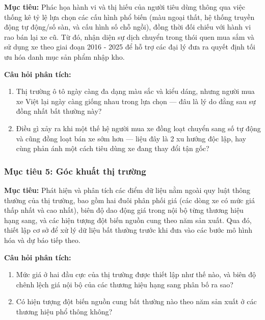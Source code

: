 \noindent\textbf{Mục tiêu:} Phác họa hành vi và thị hiếu của người tiêu dùng thông qua việc thống kê tỷ lệ lựa chọn các cấu hình phổ biến (màu ngoại thất, hệ thống truyền động tự động/số sàn, và cấu hình số chỗ ngồi), đồng thời đối chiếu với hành vi rao bán lại xe cũ. Từ đó, nhận diện sự dịch chuyển trong thói quen mua sắm và sử dụng xe theo giai đoạn 2016 - 2025 để hỗ trợ các đại lý đưa ra quyết định tối ưu hóa danh mục sản phẩm nhập kho.

\noindent\textbf{Câu hỏi phân tích:}
\begin{enumerate}
  \item Thị trường ô tô ngày càng đa dạng màu sắc và kiểu dáng, nhưng người mua xe Việt lại ngày càng giống nhau trong lựa chọn — đâu là lý do đằng sau sự đồng nhất bất thường này?
  \item Điều gì xảy ra khi một thế hệ người mua xe đồng loạt chuyển sang số tự động và cũng đồng loạt bán xe sớm hơn — liệu đây là 2 xu hướng độc lập, hay cùng phản ánh một cách tiêu dùng xe đang thay đổi tận gốc?
\end{enumerate}

\subsubsection{Mục tiêu 5: Góc khuất thị trường}

\noindent\textbf{Mục tiêu:} Phát hiện và phân tích các điểm dữ liệu nằm ngoài quy luật thông thường của thị trường, bao gồm hai đuôi phân phối giá (các dòng xe có mức giá thấp nhất và cao nhất), biên độ dao động giá trong nội bộ từng thương hiệu hạng sang, và các hiện tượng đột biến nguồn cung theo năm sản xuất. Qua đó, thiết lập cơ sở để xử lý dữ liệu bất thường trước khi đưa vào các bước mô hình hóa và dự báo tiếp theo.

\noindent\textbf{Câu hỏi phân tích:}
\begin{enumerate}
  \item Mức giá ở hai đầu cực của thị trường được thiết lập như thế nào, và biên độ chênh lệch giá nội bộ của các thương hiệu hạng sang phân bố ra sao?
  \item Có hiện tượng đột biến nguồn cung bất thường nào theo năm sản xuất ở các thương hiệu phổ thông không?
\end{enumerate}



\clearpage